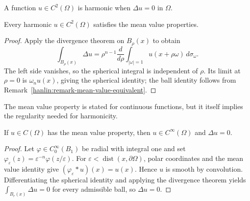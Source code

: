 \begin{definition}\label{hanlin:def-harmonic}


A function $u\in C^2(\Omega)$ is harmonic when $\Delta u=0$ in $\Omega$.
\end{definition}

\begin{theorem}\label{hanlin:thm-harmonic-mean-value}


Every harmonic $u\in C^2(\Omega)$ satisfies the mean value properties.
\end{theorem}
\begin{proof}
\sketch Apply the divergence theorem on $B_\rho(x)$ to obtain
\[
\int_{B_\rho(x)}\Delta u=\rho^{n-1}\frac d{d\rho}
\int_{|\omega|=1}u(x+\rho\omega)\,d\sigma_\omega.
\]
The left side vanishes, so the spherical integral is independent of $\rho$.
Its limit at $\rho=0$ is $\omega_nu(x)$, giving the spherical identity; the
ball identity follows from Remark~\ref{hanlin:remark-mean-value-equivalent}.
\end{proof}

\begin{remark}\label{hanlin:remark-mvp-not-smooth}
The mean value property is stated for continuous functions, but it itself
implies the regularity needed for harmonicity.
\end{remark}

\begin{theorem}\label{hanlin:thm-mean-value-harmonic}
If $u\in C(\Omega)$ has the mean value property, then $u\in C^\infty(\Omega)$
and $\Delta u=0$.
\end{theorem}
\begin{proof}
\sketch Let $\varphi\in C_0^\infty(B_1)$ be radial with integral one and set
$\varphi_\varepsilon(z)=\varepsilon^{-n}\varphi(z/\varepsilon)$. For
$\varepsilon<\operatorname{dist}(x,\partial\Omega)$, polar coordinates and
the mean value identity give $(\varphi_\varepsilon*u)(x)=u(x)$. Hence $u$ is
smooth by convolution. Differentiating the spherical identity and applying the
divergence theorem yields $\int_{B_r(x)}\Delta u=0$ for every admissible ball,
so $\Delta u=0$.
\end{proof}

